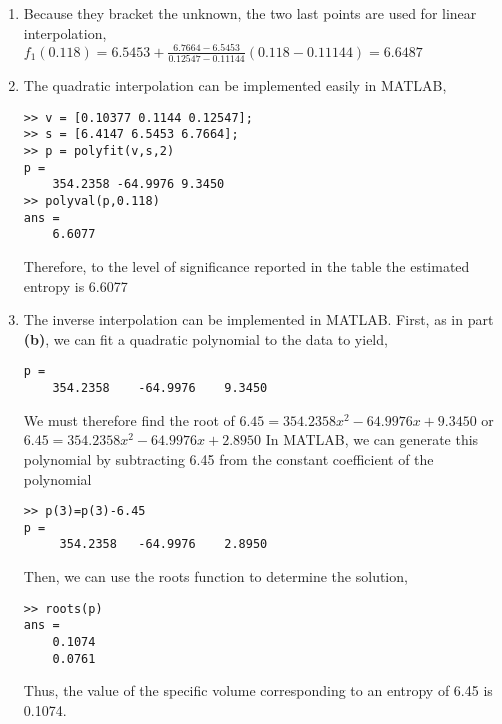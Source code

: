 \documentclass[../main.tex]{subfiles}
\begin{document}
\section{}
\begin{enumerate}[label=\bfseries(\alph*)]
\item Because they bracket the unknown, the two last points are used for linear interpolation,
	\bigbreak
$f_{1}(0.118)=6.5453+\frac{6.7664-6.5453}{0.12547-0.11144}(0.118-0.11144)=6.6487$
	\bigbreak
\item The quadratic interpolation can be implemented easily in MATLAB,
	\bigbreak
\begin{lstlisting}[numbers=none]
>> v = [0.10377 0.1144 0.12547];
>> s = [6.4147 6.5453 6.7664];
>> p = polyfit(v,s,2)
p =
	354.2358 -64.9976 9.3450
>> polyval(p,0.118)
ans =
	6.6077
\end{lstlisting}
	\bigbreak
Therefore, to the level of significance reported in the table the estimated entropy is 6.6077
	\bigbreak
\item The inverse interpolation can be implemented in MATLAB. First, as in part \textbf{(b)}, we can
fit a quadratic polynomial to the data to yield,
	\bigbreak
\begin{lstlisting}[numbers=none]
p =
	354.2358	-64.9976	9.3450 
\end{lstlisting}
\bigbreak
We must therefore find the root of 
	\bigbreak
$6.45=354.2358 x^{2}-64.9976 x+9.3450$
	\bigbreak
or
	\bigbreak
$6.45=354.2358 x^{2}-64.9976 x+2.8950$
	\bigbreak
In MATLAB, we can generate this polynomial by subtracting 6.45 from the constant
coefficient of the polynomial 
	\bigbreak
\begin{lstlisting}[numbers=none]
>> p(3)=p(3)-6.45
p =
	 354.2358	-64.9976	2.8950
\end{lstlisting}
	\bigbreak
Then, we can use the roots function to determine the solution,
	\bigbreak
\begin{lstlisting}[numbers=none]
>> roots(p)
ans =
	0.1074
	0.0761 
\end{lstlisting}
	\bigbreak
Thus, the value of the specific volume corresponding to an entropy of 6.45 is 0.1074.
	\bigbreak
\end{enumerate}
\end{document}
